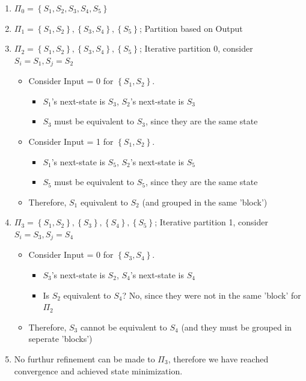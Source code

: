 \documentclass{article}
\begin{document}
\begin{enumerate}
    \item $\Pi_{0} = \left\{ S_{1},S_{2}, S_{3}, S_{4}, S_{5} \right\} $
    \item $\Pi_{1} = \left\{ S_{1},S_{2} \right\},  \left\{ S_{3},S_{4} \right\}, \left\{ S_{5} \right\}$; Partition based on Output
    \item $\Pi_{2} = \left\{ S_{1},S_{2} \right\},  \left\{ S_{3},S_{4} \right\}, \left\{ S_{5} \right\}$; Iterative partition 0, consider $S_{i} = S_{1}, S_{j} = S_{2}$
        \begin{itemize}
            \item Consider Input = 0 for $\left\{ S_{1},S_{2} \right\}$.
                \begin{itemize}
                    \item $S_{1}$'s next-state is $S_{3}$, $S_{2}$'s next-state is $S_{3}$
                    \item $S_{3}$ must be equivalent to $S_{3}$, since they are the same state
                \end{itemize}
            \item Consider Input = 1 for $\left\{ S_{1},S_{2} \right\}$.
                \begin{itemize}
                    \item $S_{1}$'s next-state is $S_{5}$, $S_{2}$'s next-state is $S_{5}$
                    \item $S_{5}$ must be equivalent to $S_{5}$, since they are the same state
                \end{itemize}
            \item Therefore, $S_{1}$ equivalent to $S_{2}$ (and grouped in the same 'block')
        \end{itemize}
    \item $\Pi_{3} = \left\{ S_{1},S_{2} \right\},  
                     \left\{ S_{3} \right\}, 
                     \left\{ S_{4} \right\}, 
                     \left\{ S_{5} \right\}$; Iterative partition 1, consider $S_{i} = S_{3}, S_{j} = S_{4}$
        \begin{itemize}
            \item Consider Input = 0 for $\left\{ S_{3},S_{4} \right\}$.
                \begin{itemize}
                    \item $S_{3}$'s next-state is $S_{2}$, $S_{4}$'s next-state is $S_{4}$
                    \item Is $S_{2}$ equivalent to $S_{4}$? No, since they were not in the same 'block' for $\Pi_{2}$
                \end{itemize}
            \item Therefore, $S_{3}$ cannot be equivalent to $S_{4}$ (and they must be grouped in seperate 'blocks')
        \end{itemize}
    \item No furthur refinement can be made to $\Pi_{3}$, therefore we have reached convergence and achieved state minimization.
\end{enumerate}
\end{document}
